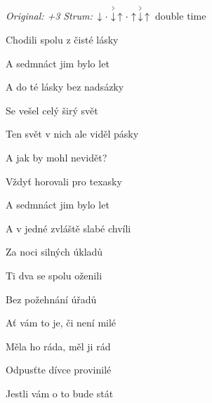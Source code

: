 \begin{song}


\begin{headerbox}
\RaiseBoxWithChucks
\textit{Original: +3} \quad
\textit{Strum:} $\Down\Miss\AccentDown\Up\Miss\Up\AccentDown\Up$ double time
\end{headerbox}

\begin{hchordbox}
\end{hchordbox}

\Large

\bigskip

 Chodili spolu z čisté lásky  \par
{} A sedmnáct jim bylo let  \par
{} A do té lásky bez nadsázky  \par
{} Se vešel celý širý svět \par
{} Ten svět v nich ale viděl pásky \par
{} A jak by mohl nevidět?  \par
{} Vždyť horovali pro texasky  \par
{} A sedmnáct jim bylo let  \par

\bigskip

 A v jedné zvláště slabé chvíli  \par
{} Za noci silných úkladů  \par
{} Ti dva se spolu oženili  \par
{} Bez požehnání úřadů \par
{} Ať vám to je, či není milé \par
{} Měla ho ráda, měl ji rád  \par
{} Odpusťte dívce provinilé  \par
{} Jestli vám o to bude stát  \par


\end{song}
